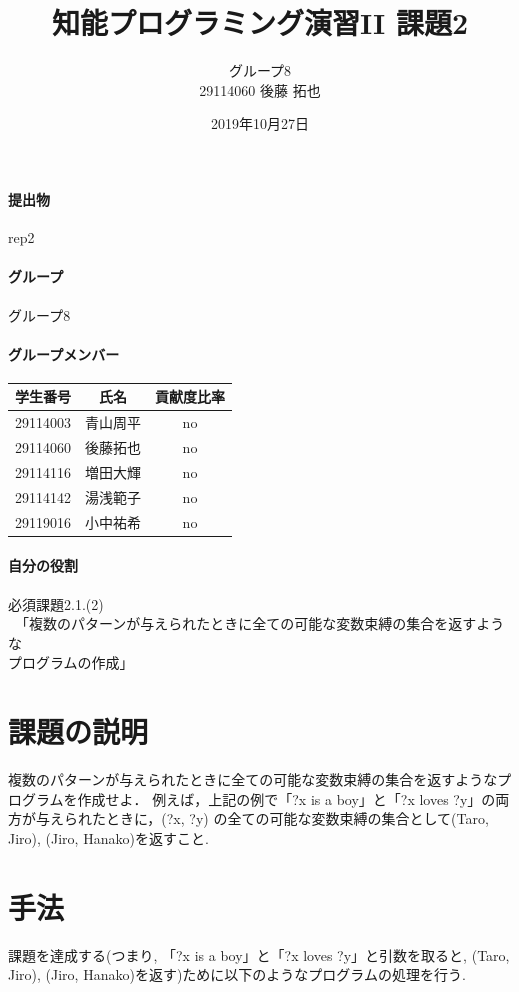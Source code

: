\documentclass[uplatex,12pt]{jsarticle}
\title{知能プログラミング演習II 課題2}
\author{グループ8\\
  29114060 後藤 拓也\\
}
\date{2019年10月27日}
\begin{document}
\maketitle

\paragraph{提出物} rep2

\paragraph{グループ} グループ8

\paragraph{グループメンバー}
\begin{center}
\begin{tabular}{|c|c|c|}
  \hline
  学生番号&氏名&貢献度比率\\
  \hline\hline
  29114003&青山周平&no\\
  \hline
  29114060&後藤拓也&no\\
  \hline
  29114116&増田大輝&no\\
  \hline
  29114142&湯浅範子&no\\
  \hline
  29119016&小中祐希&no\\
  \hline
\end{tabular}
\end{center}
\paragraph{自分の役割} 必須課題2.1.(2)
\\　「複数のパターンが与えられたときに全ての可能な変数束縛の集合を返すような\\プログラムの作成」
\section{課題の説明}
\begin{screen}
複数のパターンが与えられたときに全ての可能な変数束縛の集合を返すようなプログラムを作成せよ．
例えば，上記の例で「?x is a boy」と「?x loves ?y」の両方が与えられたときに，(?x, ?y) の全ての可能な変数束縛の集合として{(Taro, Jiro), (Jiro, Hanako)}を返すこと.
\end{screen}

\section{手法}
課題を達成する(つまり, 「?x is a boy」と「?x loves ?y」と引数を取ると, {(Taro, Jiro), (Jiro, Hanako)}を返す)ために以下のようなプログラムの処理を行う.
\end{document}
